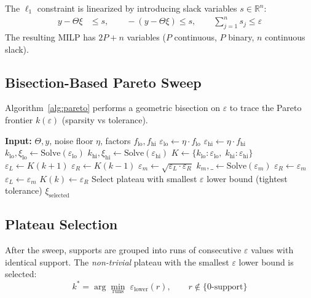 \documentclass[11pt]{article}
\begin{document}
The $\ell_1$ constraint is linearized by introducing slack variables
$s \in \mathbb{R}^n$:
\begin{align}
y - \Theta\xi &\le s, \qquad -(y - \Theta\xi) \le s, \qquad \sum_{j=1}^n s_j \le \varepsilon
\end{align}
The resulting MILP has $2P + n$ variables ($P$ continuous, $P$ binary, $n$ continuous slack).

\subsection{Bisection-Based Pareto Sweep}

Algorithm~\ref{alg:pareto} performs a geometric bisection on $\varepsilon$
to trace the Pareto frontier $k(\varepsilon)$ (sparsity vs tolerance).

\begin{algorithm}[ht]
\caption{Bisection-based Pareto sweep}
\label{alg:pareto}
\begin{algorithmic}[1]
\State \textbf{Input:} $\Theta, y$, noise floor $\eta$, factors $f_{\text{lo}}, f_{\text{hi}}$
\State $\varepsilon_{\text{lo}} \gets \eta \cdot f_{\text{lo}}$
\State $\varepsilon_{\text{hi}} \gets \eta \cdot f_{\text{hi}}$
\State $k_{\text{lo}}, \xi_{\text{lo}} \gets \text{Solve}(\varepsilon_{\text{lo}})$
\State $k_{\text{hi}}, \xi_{\text{hi}} \gets \text{Solve}(\varepsilon_{\text{hi}})$
\State $K \gets \{k_{\text{lo}}: \varepsilon_{\text{lo}}, \; k_{\text{hi}}: \varepsilon_{\text{hi}}\}$
  \State $\varepsilon_L \gets K(k+1)$ 
  \State $\varepsilon_R \gets K(k-1)$ 
    \State $\varepsilon_m \gets \sqrt{\varepsilon_L \cdot \varepsilon_R}$
    \State $k_m, \_ \gets \text{Solve}(\varepsilon_m)$
     $\varepsilon_R \gets \varepsilon_m$ \Else $\varepsilon_L \gets \varepsilon_m$ \EndIf
  \EndFor
  \State $K(k) \gets \varepsilon_R$
\EndFor
\State Select plateau with smallest $\varepsilon$ lower bound (tightest tolerance)
\State \Return $\xi_{\text{selected}}$
\end{algorithmic}
\end{algorithm}

\subsection{Plateau Selection}

After the sweep, supports are grouped into runs of consecutive $\varepsilon$ values
with identical support. The \emph{non-trivial} plateau with the smallest
$\varepsilon$ lower bound is selected:
\begin{equation}
k^* = \arg\min_{\text{runs}} \; \varepsilon_{\text{lower}}(r), \qquad r \notin \{0\text{-support}\}
\end{equation}
\end{document}
